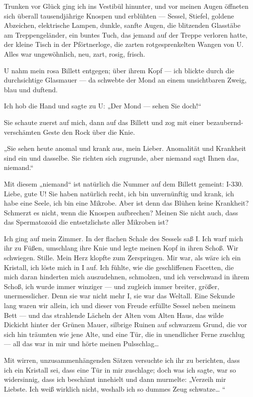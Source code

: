 Trunken vor Glück ging ich ins Vestibül hinunter, und vor meinen
Augen öffneten sich überall tausendjährige Knospen und erblühten —
Sessel, Stiefel, goldene Abzeichen, elektrische Lampen, dunkle,
sanfte Augen, die blitzenden Glasstäbe am Treppengeländer, ein
buntes Tuch, das jemand auf der Treppe verloren hatte, der kleine
Tisch in der Pförtnerloge, die zarten rotgesprenkelten Wangen von
U. Alles war ungewöhnlich, neu, zart, rosig, frisch.

U nahm mein rosa Billett entgegen; über ihrem Kopf — ich blickte
durch die durchsichtige Glasmauer — da schwebte der Mond an einem
unsichtbaren Zweig, blau und duftend.

Ich hob die Hand und sagte zu U: „Der Mond — sehen Sie doch!“

Sie schaute zuerst auf mich, dann auf das Billett und zog mit einer
bezaubernd-verschämten Geste den Rock über die Knie.

„Sie sehen heute anomal und krank aus, mein Lieber. Anomalität und
Krankheit sind ein und dasselbe. Sie richten sich zugrunde, aber
niemand sagt Ihnen das, niemand.“

Mit diesem „niemand“ ist natürlich die Nummer auf dem Billett
gemeint: I-330. Liebe, gute U! Sie haben natürlich recht, ich bin
unvernünftig und krank, ich habe eine Seele, ich bin eine Mikrobe.
Aber ist denn das Blühen keine Krankheit? Schmerzt es nicht, wenn
die Knospen aufbrechen? Meinen Sie nicht auch, dass das
Spermatozoid die entsetzlichste aller Mikroben ist?

Ich ging auf mein Zimmer. In der flachen Schale des Sessels saß I.
Ich warf mich ihr zu Füßen, umschlang ihre Knie und legte meinen
Kopf in ihren Schoß. Wir schwiegen. Stille. Mein Herz klopfte zum
Zerspringen. Mir war, als wäre ich ein Kristall, ich löste mich in
I auf. Ich fühlte, wie die geschliffenen Facetten, die mich daran
hinderten mich auszudehnen, schmolzen, und ich verschwand in ihrem
Schoß, ich wurde immer winziger — und zugleich immer breiter,
größer, unermesslicher. Denn sie war nicht mehr I, sie war das
Weltall. Eine Sekunde lang waren wir allein, ich und dieser von
Freude erfüllte Sessel neben
meinem Bett — und das strahlende Lächeln der Alten vom Alten Haus,
das wilde Dickicht hinter der Grünen Mauer, silbrige Ruinen auf
schwarzem Grund, die vor sich hin träumten wie jene Alte, und eine
Tür, die in unendlicher Ferne zuschlug — all das war in mir und
hörte meinen Pulsschlag\ldots{}

Mit wirren, unzusammenhängenden Sätzen versuchte ich ihr zu
berichten, dass ich ein Kristall sei, dass eine Tür in mir
zuschlage; doch was ich sagte, war so widersinnig, dass ich
beschämt innehielt und dann murmelte: „Verzeih mir Liebste. Ich
weiß wirklich nicht, weshalb ich so dummes Zeug schwatze\ldots{} “

